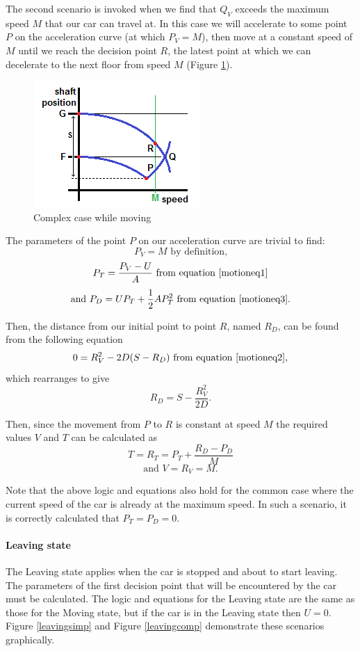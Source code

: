 \documentclass{UoYCSproject}
\begin{document}
The second scenario is invoked when we find that $Q_V$ exceeds the maximum speed $M$ that our car can travel at.  In this case we will accelerate to some point $P$ on the acceleration curve (at which $P_V=M$), then move at a constant speed of $M$ until we reach the decision point $R$, the latest point at which we can decelerate to the next floor from speed $M$ (Figure \ref{movingcomp}).

\begin{figure} [h]
	\centering
	\includegraphics{moving_comp.png}
	\caption{Complex case while moving}
	\label{movingcomp}
\end{figure}

The parameters of the point $P$ on our acceleration curve are trivial to find:
\[ P_V=M \text{ by definition,} \]
\[ P_T=\frac{P_V-U}{A} \text{ from equation \ref{motioneq1}} \]
\[ \text{and } P_D=UP_T+\frac{1}{2}AP_T^2 \text{ from equation \ref{motioneq3}.} \]

Then, the distance from our initial point to point $R$, named $R_D$, can be found from the following equation
\[ 0=R_V^2-2D(S-R_D) \text{ from equation \ref{motioneq2},} \]
which rearranges to give
\[ R_D = S - \frac{R_V^2}{2D} \text{.} \]

Then, since the movement from $P$ to $R$ is constant at speed $M$ the required values $V$ and $T$ can be calculated as
\[ T = R_T = P_T+\frac{R_D-P_D}{M} \]
\[ \text{and } V = R_V = M \text{.} \]

Note that the above logic and equations also hold for the common case where the current speed of the car is already at the maximum speed.  In such a scenario, it is correctly calculated that $P_T=P_D=0$.

\paragraph{Leaving state}

The Leaving state applies when the car is stopped and about to start leaving.  The parameters of the first decision point that will be encountered by the car must be calculated.  The logic and equations for the Leaving state are the same as those for the Moving state, but if the car is in the Leaving state then $U=0$.  Figure \ref{leavingsimp} and Figure \ref{leavingcomp} demonstrate these scenarios graphically.
\end{document}
